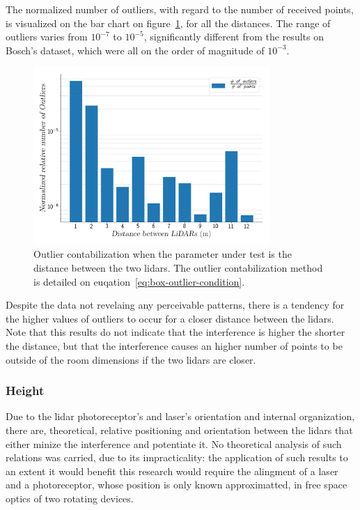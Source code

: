 The normalized number of outliers, with regard to the number of received points, is visualized on the bar chart on figure~\ref{fig:box-filter-outliers-distance}, for all the distances. The range of outliers varies from $10^{-7}$ to $10^{-5}$, significantly different from the results on Bosch's dataset, which were all on the order of magnitude of $10^{-3}$.

\begin{figure}[!ht]
	\centering
	\includegraphics[width=0.8\textwidth]{img/lidar-interference/box-filtering/interference-box-filter-outliers-distance.png}
	\caption{Outlier contabilization when the parameter under test is the distance between the two \acp{lidar}. The outlier contabilization method is detailed on euqation~\ref{eq:box-outlier-condition}.}
	\label{fig:box-filter-outliers-distance}
\end{figure}

Despite the data not revelaing any perceivable patterns, there is a tendency for the higher values of outliers to occur for a closer distance between the \acp{lidar}. Note that this results do not indicate that the interference is higher the shorter the distance, but that the interference causes an higher number of points to be outside of the room dimensions if the two \acp{lidar} are closer. 

\subsubsection{Height}
Due to the \ac{lidar} photoreceptor's and laser's orientation and internal organization, there are, theoretical, relative positioning and orientation between the \acp{lidar} that either minize the interference and potentiate it. No theoretical analysis of such relations was carried, due to its impracticality: the application of such results to an extent it would benefit this research would require the alingment of a laser and a photoreceptor, whose position is only known approximatted, in free space optics of two rotating devices.

